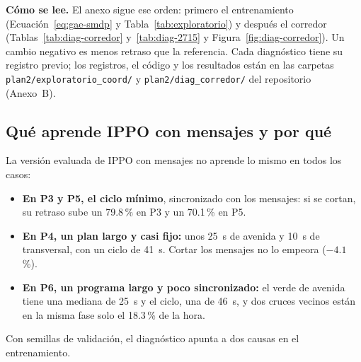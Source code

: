 
\textbf{Cómo se lee.} El anexo sigue ese orden: primero el
entrenamiento (Ecuación~\ref{eq:gae-smdp} y
Tabla~\ref{tab:exploratorio}) y después el corredor
(Tablas~\ref{tab:diag-corredor} y~\ref{tab:diag-2715} y
Figura~\ref{fig:diag-corredor}). Un cambio negativo es menos retraso que
la referencia. Cada diagnóstico tiene su registro previo; los
registros, el código y los resultados están en las carpetas
\texttt{plan2/\allowbreak exploratorio\_coord/} y
\texttt{plan2/\allowbreak diag\_corredor/} del repositorio (Anexo~B).

\subsection*{Qué aprende IPPO con mensajes y por qué}

La versión evaluada de IPPO con mensajes no aprende lo mismo en todos
los casos:
\begin{itemize}
  \item \textbf{En P3 y P5, el ciclo mínimo}, sincronizado con los
    mensajes: si se cortan, su retraso sube un 79.8\,\% en P3 y un
    70.1\,\% en P5.
  \item \textbf{En P4, un plan largo y casi fijo:} unos 25~s de avenida
    y 10~s de transversal, con un ciclo de 41~s. Cortar los mensajes no
    lo empeora ($-4.1$\,\%).
  \item \textbf{En P6, un programa largo y poco sincronizado:} el verde
    de avenida tiene una mediana de 25~s y el ciclo, una de 46~s, y dos
    cruces vecinos están en la misma fase solo el 18.3\,\% de la hora.
\end{itemize}
Con semillas de validación, el diagnóstico apunta a dos causas en el
entrenamiento.

